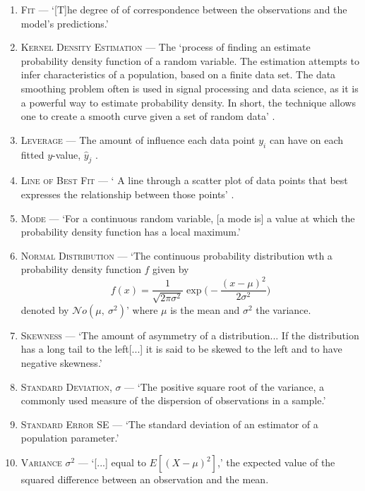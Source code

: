 \documentclass[a4paper,10pt]{report}
\begin{document}
\begin{enumerate}
	\item \label{def:fit} \textsc{Fit} --- `[T]he degree of of correspondence between the observations and the model's predictions.'
	
	\item \label{def:kerneldensityestimate} \textsc{Kernel Density Estimation} --- The `process of finding an estimate probability density function of a random variable. The estimation attempts to infer characteristics of a population, based on a finite data set. The data smoothing problem often is used in signal processing and data science, as it is a powerful way to estimate probability density. In short, the technique allows one to create a smooth curve given a set of random data' \autocite{kerneldensity}.
	
	\item \label{def:leverage} \textsc{Leverage} --- The amount of influence each data point $y_i$ can have on each fitted $y$-value, $\hat{y}_j$ \autocite{HoaglinWelsch78}.
	
	\item \label{def:lineofbestfit} \textsc{Line of Best Fit} --- ` A line through a scatter plot of data points that best expresses the relationship between those points' \autocite{lineofbestfit}.
	
	\item \label{def:mode} \textsc{Mode} --- `For a continuous random variable, [a mode is] a value at which the probability density function has a local maximum.'
	
	\item \label{def:normaldist} \textsc{Normal Distribution} --- `The continuous probability distribution wth a probability density function $f$ given by 
	$$f(x) = \frac{1}{\sqrt{2\pi\sigma^2}}\exp\bigg(-\frac{(x-\mu)^2}{2\sigma^2} \bigg) $$
	denoted by $\mathcal{N}o(\mu,\ \sigma^2)$' where $\mu$ is the mean and $\sigma^2$ the variance.
	
	\item\label{def:skewness}\textsc{Skewness} --- `The amount of asymmetry of a distribution... If the distribution has a long tail to the left[...] it is said to be skewed to the left and to have negative skewness.'
	
	\item \label{def:stddev} \textsc{Standard Deviation}, $\sigma$ --- `The positive square root of the variance, a commonly used measure of the dispersion of observations in a sample.'
	
	\item\label{def:standarderror}\textsc{Standard Error} SE --- `The standard deviation of an estimator of a population parameter.'
	
	\item \label{def:variance} \textsc{Variance} $\sigma^2$ --- `[...] equal to $E[(X-\mu)^2]$,' the expected value of the squared difference between an observation and the mean.
	
\end{enumerate}
\end{document}
